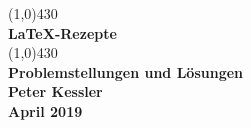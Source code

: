 \begin{center}
  \vspace*{5.5cm}
  \line(1,0){430}\\
  [5mm]
  \Huge \textbf{\LaTeX-Rezepte} \\
  [4mm]
  \line(1,0){430}\\
  \vspace{1.5cm}
  \LARGE\textbf{Problemstellungen und Lösungen}\\
  \vspace{1.5cm}
  \Large\textbf{Peter Kessler}\\  
  \Large\textbf{April 2019}\\  
  \vfill
\end{center}

